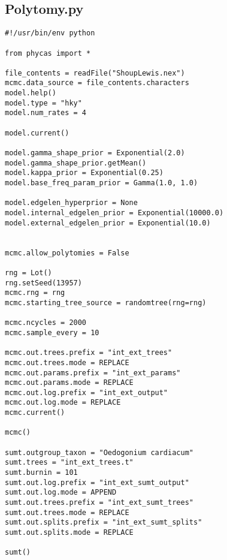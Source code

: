 \documentclass{article}
\begin{document}
\subsection{Polytomy.py}\label{Polytomy}
\begin{verbatim}
#!/usr/bin/env python

from phycas import *

file_contents = readFile("ShoupLewis.nex")
mcmc.data_source = file_contents.characters
model.help()
model.type = "hky"
model.num_rates = 4

model.current()

model.gamma_shape_prior = Exponential(2.0)
model.gamma_shape_prior.getMean()
model.kappa_prior = Exponential(0.25)
model.base_freq_param_prior = Gamma(1.0, 1.0)

model.edgelen_hyperprior = None
model.internal_edgelen_prior = Exponential(10000.0)
model.external_edgelen_prior = Exponential(10.0)


mcmc.allow_polytomies = False

rng = Lot()
rng.setSeed(13957)
mcmc.rng = rng
mcmc.starting_tree_source = randomtree(rng=rng)

mcmc.ncycles = 2000
mcmc.sample_every = 10

mcmc.out.trees.prefix = "int_ext_trees" 
mcmc.out.trees.mode = REPLACE 
mcmc.out.params.prefix = "int_ext_params" 
mcmc.out.params.mode = REPLACE 
mcmc.out.log.prefix = "int_ext_output" 
mcmc.out.log.mode = REPLACE 
mcmc.current()

mcmc()

sumt.outgroup_taxon = "Oedogonium cardiacum" 
sumt.trees = "int_ext_trees.t" 
sumt.burnin = 101 
sumt.out.log.prefix = "int_ext_sumt_output" 
sumt.out.log.mode = APPEND 
sumt.out.trees.prefix = "int_ext_sumt_trees" 
sumt.out.trees.mode = REPLACE 
sumt.out.splits.prefix = "int_ext_sumt_splits" 
sumt.out.splits.mode = REPLACE 

sumt()


\end{verbatim}


\newpage

\end{document}
